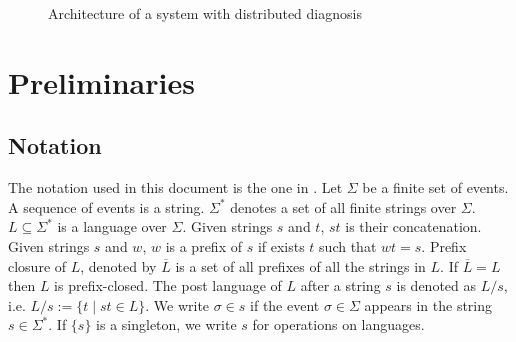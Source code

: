 \documentclass[letterpaper, 10pt, conference]{ieeeconf}
\begin{document}
\begin{figure}[t]
\centering
{}
\caption{Architecture of a system with distributed diagnosis}
\label{fig_distributed}
\end{figure}


\section{Preliminaries}
\label{sec:Preliminaries}

\subsection{Notation}
The notation used in this document is the one in
\cite{cassandras_introduction_2010}.
Let $\Sigma$ be a finite set of events. A sequence of events is a string.
$\Sigma^*$ denotes a set of all finite strings over $\Sigma$.
$L\subseteq\Sigma^*$ is a language over $\Sigma$. Given strings $s$ and $t$,
$st$ is their concatenation. Given strings $s$ and $w$, $w$ is a prefix of $s$
if exists $t$ such that $wt = s$. Prefix closure of $L$, denoted by
$\overline{L}$ is a set of all prefixes of all the strings in $L$.
If $\overline{L} = L$ then $L$ is prefix-closed. The post language of $L$ after
a string $s$ is denoted as $L/s$, i.e. $L/s := \{t\mid st \in L\}$. We
write $\sigma \in s$ if the event $\sigma \in \Sigma$ appears in the string $s
\in \Sigma^*$. If $\{s\}$ is a singleton, we write $s$ for operations on
languages.
\end{document}
